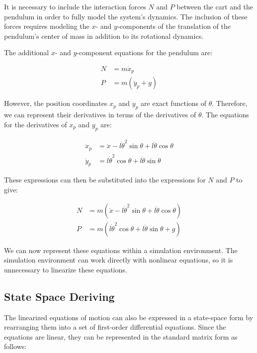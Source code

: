 \documentclass[11pt,twocolumn,twoside,lineno]{pnas-new}
\begin{document}
It is necessary to include the interaction forces \(N\) and \(P\) between the cart and the pendulum in order to fully model the system's dynamics. The inclusion of these forces requires modeling the \(x\)- and \(y\)-components of the translation of the pendulum's center of mass in addition to its rotational dynamics.

The additional \(x\)- and \(y\)-component equations for the pendulum are:

\begin{align}
N &= m\ddot{x}_p \\
P &= m(\ddot{y}_p + g)
\end{align}

However, the position coordinates \(x_p\) and \(y_p\) are exact functions of \(\theta\). Therefore, we can represent their derivatives in terms of the derivatives of \(\theta\). The equations for the derivatives of \(x_p\) and \(y_p\) are:

\begin{align}
\ddot{x}_p &= \ddot{x} - l\dot{\theta}^2\sin\theta + l\ddot{\theta}\cos\theta \\
\ddot{y}_p &= l\dot{\theta}^2\cos\theta + l\ddot{\theta}\sin\theta
\end{align}

These expressions can then be substituted into the expressions for \(N\) and \(P\) to give:

\begin{align}
N &= m(\ddot{x} - l\dot{\theta}^2\sin\theta + l\ddot{\theta}\cos\theta) \\
P &= m(l\dot{\theta}^2\cos\theta + l\ddot{\theta}\sin\theta + g)
\end{align}

We can now represent these equations within a simulation environment. The simulation environment can work directly with nonlinear equations, so it is unnecessary to linearize these equations.

\subsection{State Space Deriving}
The linearized equations of motion can also be expressed in a state-space form by rearranging them into a set of first-order differential equations. Since the equations are linear, they can be represented in the standard matrix form as follows:
\end{document}
